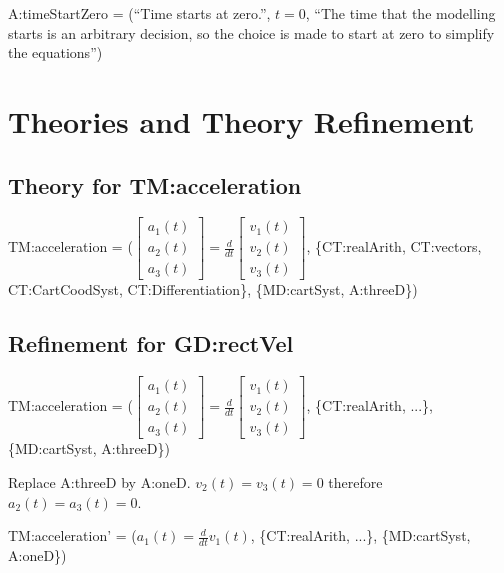 \documentclass{article}
\begin{document}
\noindent A:timeStartZero = (``Time starts at zero.'', $t = 0$, ``The time that
the modelling starts is an arbitrary decision, so the choice is made to start at
zero to simplify the equations'')

\section{Theories and Theory Refinement}

\subsection{Theory for TM:acceleration}

\noindent TM:acceleration = ($
    \left [ 
    \begin{array}{c}
    a_1(t)\\
    a_2(t)\\
    a_3(t) 
    \end{array} 
    \right ] =
    \frac{d}{dt}
    \left [ 
    \begin{array}{c}
    v_1(t)\\
    v_2(t)\\
    v_3(t) 
    \end{array} 
    \right ]
    $, \{CT:realArith, CT:vectors, CT:CartCoodSyst, CT:Differentiation\}, \{MD:cartSyst, A:threeD\})
    
\subsection{Refinement for GD:rectVel}

TM:acceleration = ($
    \left [ 
    \begin{array}{c}
    a_1(t)\\
    a_2(t)\\
    a_3(t) 
    \end{array} 
    \right ] =
    \frac{d}{dt}
    \left [ 
    \begin{array}{c}
    v_1(t)\\
    v_2(t)\\
    v_3(t) 
    \end{array} 
    \right ]
    $, \{CT:realArith, ...\}, \{MD:cartSyst, A:threeD\})

\noindent Replace A:threeD by A:oneD.  $v_2(t) = v_3(t) = 0$ therefore $a_2(t) = a_3(t) = 0$.

TM:acceleration' = ($a_1(t) = \frac{d}{dt} v_1(t)$, \{CT:realArith,
...\}, \{MD:cartSyst, A:oneD\})
\end{document}
